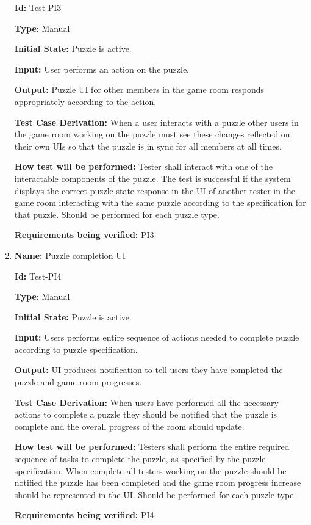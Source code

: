 \documentclass[12pt, titlepage]{article}
\begin{document}
\begin{enumerate}
\textbf{Id:} Test-PI3

\textbf{Type}: Manual

\textbf{Initial State:} Puzzle is active.

\textbf{Input:} User performs an action on the puzzle.

\textbf{Output:} Puzzle UI for other members in the game room responds appropriately according to the action.

\textbf{Test Case Derivation:}
When a user interacts with a puzzle other users in the game room working on the puzzle must see these changes reflected on their own UIs so that the puzzle is in sync for all members at all times.

\textbf{How test will be performed:}
Tester shall interact with one of the interactable components of the puzzle. The test is successful if the system displays the correct puzzle state response in the UI of another tester in the game room interacting with the same puzzle according to the specification for that puzzle. Should be performed for each puzzle type.

\textbf{Requirements being verified: } PI3

\item{\textbf{Name:} Puzzle completion UI} \label{itm:Test-PI5}

\textbf{Id:} Test-PI4

\textbf{Type}: Manual

\textbf{Initial State:} Puzzle is active.

\textbf{Input:} Users performs entire sequence of actions needed to complete puzzle according to puzzle specification.

\textbf{Output:} UI produces notification to tell users they have completed the puzzle and game room progresses.

\textbf{Test Case Derivation:}
When users have performed all the necessary actions to complete a puzzle they should be notified that the puzzle is complete and the overall progress of the room should update.

\textbf{How test will be performed:}
Testers shall perform the entire required sequence of tasks to complete the puzzle, as specified by the puzzle specification. When complete all testers working on the puzzle should be notified the puzzle has been completed and the game room progress increase should be represented in the UI. Should be performed for each puzzle type.

\textbf{Requirements being verified: } PI4


\end{enumerate}
\end{document}
